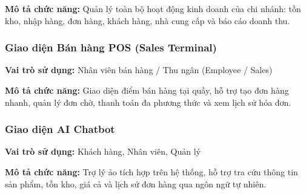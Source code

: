 \documentclass[12pt,a4paper]{report}
\begin{document}
\textbf{Mô tả chức năng:} Quản lý toàn bộ hoạt động kinh doanh của chi nhánh: tồn kho, nhập hàng, đơn hàng, khách hàng, nhà cung cấp và báo cáo doanh thu.

\subsubsection{Giao diện Bán hàng POS (Sales Terminal)}

\textbf{Vai trò sử dụng:} Nhân viên bán hàng / Thu ngân (Employee / Sales)

\textbf{Mô tả chức năng:} Giao diện điểm bán hàng tại quầy, hỗ trợ tạo đơn hàng nhanh, quản lý đơn chờ, thanh toán đa phương thức và xem lịch sử hóa đơn.

\subsubsection{Giao diện AI Chatbot}

\textbf{Vai trò sử dụng:} Khách hàng, Nhân viên, Quản lý

\textbf{Mô tả chức năng:} Trợ lý ảo tích hợp trên hệ thống, hỗ trợ tra cứu thông tin sản phẩm, tồn kho, giá cả và lịch sử đơn hàng qua ngôn ngữ tự nhiên.
\end{document}
